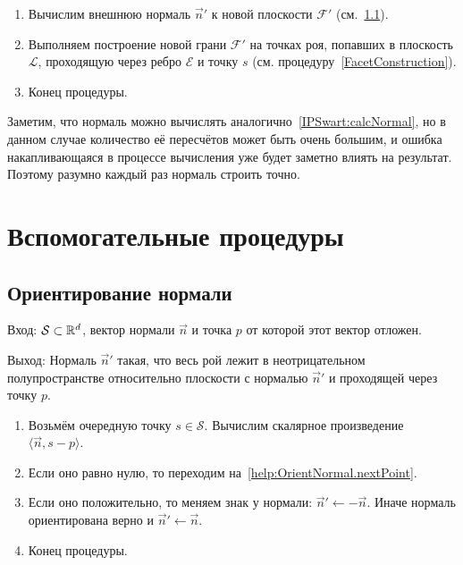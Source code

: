 \documentclass[a4paper,12pt]{article}
\newcommand{\R}[1][]{%
  \ifthenelse{\equal{#1}{}}%
  {\mathbb{R}}%
  {\mathbb{R}^{#1}}}
\newcommand{\Swarm}{\mathcal{S}}              %
\newcommand{\Facet}{\mathcal{F}}              %
\newcommand{\Edge}{\mathcal{E}}               %
\newcommand{\scalprod}[3][]{#1\langle #2, #3 #1\rangle} %
\newcommand{\Plane}{\mathcal{L}}           %
\renewcommand{\.}{\hspace{0.2ex}}
\begin{document}
\begin{enumerate}
      \item Вычислим внешнюю нормаль $\vec n'$ к новой плоскости $\Facet'$ (см.~\ref{help:OrientNormal}).

      \item Выполняем построение новой грани $\Facet'$ на точках роя, попавших в плоскость $\Plane$, проходящую через ребро $\Edge$ и точку $s$ (см. процедуру~\ref{FacetConstruction}).

      \item Конец процедуры.

    \end{enumerate}


    Заметим, что нормаль можно вычислять аналогично~\ref{IPSwart:calcNormal}, но в данном случае количество её пересчётов может быть очень большим, и ошибка накапливающаяся в процессе вычисления уже будет заметно влиять на результат. Поэтому разумно каждый раз нормаль строить точно.

\section{Вспомогательные процедуры}

  \subsection{Ориентирование нормали}
    \label{help:OrientNormal}
    Вход: $\Swarm \subset \R[d]$, вектор нормали $\vec n$ и точка $p$ от которой этот вектор отложен.

    Выход: Нормаль $\vec n'$ такая, что весь рой лежит в неотрицательном полупространстве относительно плоскости с нормалью $\vec n'$ и проходящей через точку $p$.

    \begin{enumerate}
      \label{help:OrientNormal.nextPoint}
      \item Возьмём очередную точку $s \in \Swarm$. Вычислим скалярное произведение $\scalprod{\vec n}{s - p}$.

      \item Если оно равно нулю, то переходим на~\ref{help:OrientNormal.nextPoint}.


      \item Если оно положительно, то меняем знак у нормали: $\vec n' \leftarrow - \vec n$. Иначе нормаль ориентирована верно и $\vec n' \leftarrow \vec n$.

      \item Конец процедуры.
    \end{enumerate}
\end{document}
